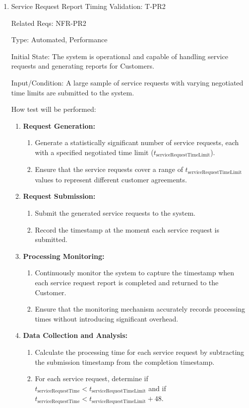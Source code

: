 \documentclass[12pt, titlepage]{article}
\begin{document}
\begin{enumerate}
\item{Service Request Report Timing Validation: T-PR2\\}

Related Reqs: NFR-PR2

Type: Automated, Performance

Initial State: The system is operational and capable of handling service requests and generating reports for Customers.

Input/Condition: A large sample of service requests with varying negotiated time limits are submitted to the system.

How test will be performed:
\begin{enumerate}
    \item \textbf{Request Generation:}
    \begin{enumerate}
        \item Generate a statistically significant number of service requests, each with a specified negotiated time limit ($t_{\text{serviceRequestTimeLimit}}$).
        \item Ensure that the service requests cover a range of $t_{\text{serviceRequestTimeLimit}}$ values to represent different customer agreements.
    \end{enumerate}
    
    \item \textbf{Request Submission:}
    \begin{enumerate}
        \item Submit the generated service requests to the system.
        \item Record the timestamp at the moment each service request is submitted.
    \end{enumerate}
    
    \item \textbf{Processing Monitoring:}
    \begin{enumerate}
        \item Continuously monitor the system to capture the timestamp when each service request report is completed and returned to the Customer.
        \item Ensure that the monitoring mechanism accurately records processing times without introducing significant overhead.
    \end{enumerate}
    
    \item \textbf{Data Collection and Analysis:}
    \begin{enumerate}
        \item Calculate the processing time for each service request by subtracting the submission timestamp from the completion timestamp.
        \item For each service request, determine if $t_{\text{serviceRequestTime}} < t_{\text{serviceRequestTimeLimit}}$ and if $t_{\text{serviceRequestTime}} < t_{\text{serviceRequestTimeLimit}} + 48$.
    \end{enumerate}
    

\end{enumerate}
\end{enumerate}
\end{document}

